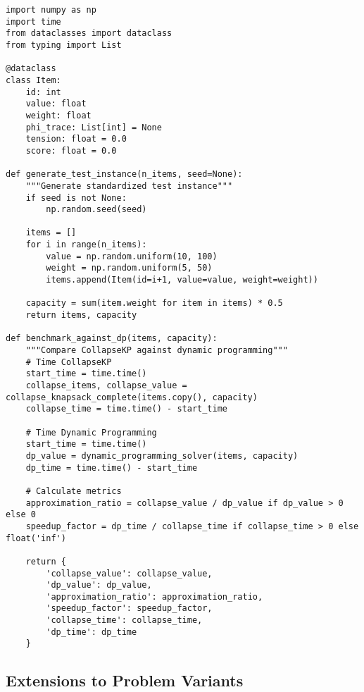 \documentclass[11pt]{article}
\theoremstyle{remark}
\theoremstyle{definition}
\begin{document}
\begin{lstlisting}[caption=Comprehensive Experiment Setup]
import numpy as np
import time
from dataclasses import dataclass
from typing import List

@dataclass
class Item:
    id: int
    value: float
    weight: float
    phi_trace: List[int] = None
    tension: float = 0.0
    score: float = 0.0

def generate_test_instance(n_items, seed=None):
    """Generate standardized test instance"""
    if seed is not None:
        np.random.seed(seed)
    
    items = []
    for i in range(n_items):
        value = np.random.uniform(10, 100)
        weight = np.random.uniform(5, 50)
        items.append(Item(id=i+1, value=value, weight=weight))
    
    capacity = sum(item.weight for item in items) * 0.5
    return items, capacity

def benchmark_against_dp(items, capacity):
    """Compare CollapseKP against dynamic programming"""
    # Time CollapseKP
    start_time = time.time()
    collapse_items, collapse_value = collapse_knapsack_complete(items.copy(), capacity)
    collapse_time = time.time() - start_time
    
    # Time Dynamic Programming
    start_time = time.time()
    dp_value = dynamic_programming_solver(items, capacity)
    dp_time = time.time() - start_time
    
    # Calculate metrics
    approximation_ratio = collapse_value / dp_value if dp_value > 0 else 0
    speedup_factor = dp_time / collapse_time if collapse_time > 0 else float('inf')
    
    return {
        'collapse_value': collapse_value,
        'dp_value': dp_value,
        'approximation_ratio': approximation_ratio,
        'speedup_factor': speedup_factor,
        'collapse_time': collapse_time,
        'dp_time': dp_time
    }
\end{lstlisting}

\subsection{Extensions to Problem Variants}
\end{document}
